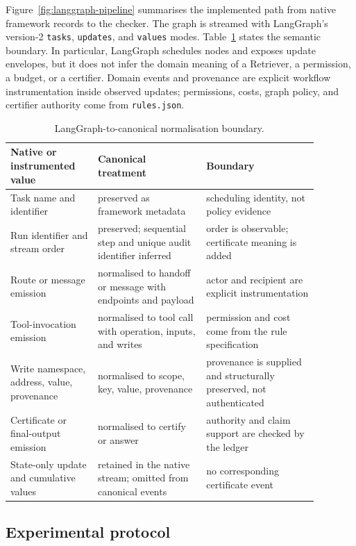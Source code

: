 \documentclass[a4paper,fleqn]{cas-sc}
\begin{document}
Figure~\ref{fig:langgraph-pipeline} summarises the implemented path from native
framework records to the checker. The graph is streamed with LangGraph's
version-2 \texttt{tasks},
\texttt{updates}, and \texttt{values} modes. Table~\ref{tab:adapter-boundary}
states the semantic boundary. In particular, LangGraph schedules nodes and
exposes update envelopes, but it does not infer the domain meaning of a
Retriever, a permission, a budget, or a certifier. Domain events and provenance
are explicit workflow instrumentation inside observed updates; permissions,
costs, graph policy, and certifier authority come from \texttt{rules.json}.

\begin{table}[tbp]
\centering
\scriptsize
\begin{tabular}{>{\raggedright\arraybackslash}p{0.25\linewidth}>{\raggedright\arraybackslash}p{0.31\linewidth}>{\raggedright\arraybackslash}p{0.32\linewidth}}
\toprule
Native or instrumented value & Canonical treatment & Boundary \\
\midrule
Task name and identifier & preserved as framework metadata & scheduling identity, not policy evidence \\
Run identifier and stream order & preserved; sequential step and unique audit identifier inferred & order is observable; certificate meaning is added \\
Route or message emission & normalised to handoff or message with endpoints and payload & actor and recipient are explicit instrumentation \\
Tool-invocation emission & normalised to tool call with operation, inputs, and writes & permission and cost come from the rule specification \\
Write namespace, address, value, provenance & normalised to scope, key, value, provenance & provenance is supplied and structurally preserved, not authenticated \\
Certificate or final-output emission & normalised to certify or answer & authority and claim support are checked by the ledger \\
State-only update and cumulative values & retained in the native stream; omitted from canonical events & no corresponding certificate event \\
\bottomrule
\end{tabular}
\caption{LangGraph-to-canonical normalisation boundary.}
\label{tab:adapter-boundary}
\end{table}

\subsection{Experimental protocol}
\end{document}
